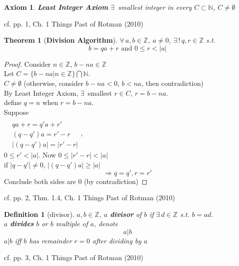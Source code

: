 \documentclass[10pt]{amsart}
\newtheorem{theorem}{Theorem}
\newtheorem{axiom}{Axiom}
\newtheorem{definition}{Definition}
\begin{document}
\begin{multicols*}{2}
\begin{axiom} \textbf{Least Integer Axiom}
	$\exists \, $ smallest integer in every $C \subset \mathbb{N}$, $C\neq \emptyset$
\end{axiom}
cf. pp. 1, Ch. 1 Things Past of Rotman (2010) \cite{JRotman2010}  


\begin{theorem}[\textbf{Division Algorithm}] 
	$\forall \, a , b \in \mathbb{Z}$, $a\neq 0$, $\exists \, ! \, q,r \in \mathbb{Z}$ s.t. 
	\[
	b = qa + r \text{ and } 0 \leq r < |a|
	\]
\end{theorem}


\begin{proof}
	Consider $n \in \mathbb{Z}$, $b-na \in \mathbb{Z}$ \\
	Let $C= \lbrace b - na | n \in \mathbb{Z} \rbrace \bigcap \mathbb{N}$.  \\
	\phantom{\quad} $C\neq \emptyset$ (otherwise, consider $b-na < 0$, $b<na$, then contradiction) \\
	By Least Integer Axiom, $\exists \, $ smallest $r\in C$, $r= b-na$.  \\
	\phantom{\quad } define $q=n$ when $r=b-na$.  \\
	Suppose \\
	$\begin{aligned}  & \quad \\ & qa + r = q'a + r' \\ & (q-q')a = r'-r \\ & |(q-q')a| = |r'-r| \end{aligned}$, \\

	$0\leq r' < |a|$.  Now $0\leq |r'-r | < |a|$ \\
	\phantom{\quad } if $|q-q'| \neq 0$, $|(q-q')a | \geq |a|$ 
	\[
	\Longrightarrow q=q', r=r'
	\]
	Conclude both sides are $0$ (by contradiction)
\end{proof}
cf. pp. 2, Thm. 1.4, Ch. 1 Things Past of Rotman (2010) \cite{JRotman2010}  

\begin{definition}[divisor]
	$a,b \in \mathbb{Z}$, $a$ \textbf{divisor} of $b$ if $\exists \, d \in \mathbb{Z}$ s.t. $b=ad$. \\
	$a$ \textbf{divides} $b$ or $b$ multiple of $a$, denote 
	\[
	a | b
	\]
	$a|b$ iff $b$ has remainder $r=0$ after dividing by $a$
\end{definition}
cf. pp. 3, Ch. 1 Things Past of Rotman (2010) \cite{JRotman2010}  



\end{multicols*}
\end{document}

